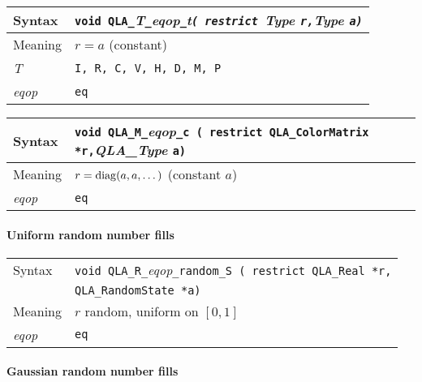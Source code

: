 \documentclass{article}
\newcommand{\diag}{\mathop{\rm diag}}
\newcommand{\tReal}{QLA\ttdash Real }
\newcommand{\tColorMatrix}{QLA\ttdash ColorMatrix }
\newcommand{\tRandomState}{QLA\ttdash RandomState }
\newcommand{\namespace}{QLA}
\newcommand{\allNumericTypes}{{\tt I, R, C, V, H, D, M, P}}
\newcommand{\ttdash}{{\tt \_}}
\newcommand{\itt}{\it T}
\newcommand{\extraarg}{}
\begin{document}
\begin{flushleft}
  \begin{tabular}{|l|l|}
  \hline
  Syntax      & {\tt void \namespace}\ttdash\itt\ttdash{\it eqop}\ttdash{\it t}{\tt ( restrict }{\it Type }{\tt *r,}{\it Type }{\tt *a\extraarg)} \\
  \hline
  Meaning     & $r = a$ (constant)\\
  \hline
  \itt        & \allNumericTypes \\
  \hline
  {\it eqop}  & {\tt eq} \\
  \hline
  \end{tabular}
\end{flushleft}

\begin{flushleft}
  \begin{tabular}{|l|l|}
  \hline
  Syntax      & {\tt void \namespace}\ttdash{\tt M}\ttdash{\it eqop}\ttdash{\tt c ( restrict \tColorMatrix *r,}{\it QLA\_Type }{\tt *a\extraarg)} \\
  \hline
  Meaning     & $r = \diag(a,a,\ldots{})$ (constant $a$)\\
  \hline
  {\it eqop}  & {\tt eq} \\
  \hline
  \end{tabular}
\end{flushleft}

\paragraph{Uniform random number fills}

\begin{flushleft}
  \begin{tabular}{|l|l|}
  \hline
  Syntax      & {\tt void \namespace}\ttdash{\tt R}\ttdash{\it eqop}\ttdash{\tt random}\ttdash{\tt S ( restrict \tReal *r,}\\
              & {\tt \tRandomState *a\extraarg )} \\
  \hline
  Meaning     & $r$ random, uniform on $[0,1]$ \\
  \hline
  {\it eqop}  & {\tt eq} \\
  \hline
  \end{tabular}
\end{flushleft}

\paragraph{Gaussian random number fills}
\end{document}
